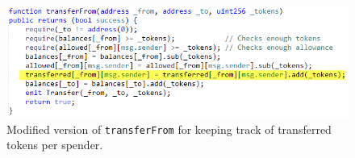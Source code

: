 \begin{figure}[t]
	\centering
	\includegraphics[width=1.0\linewidth]{figures/multiple_withdrawal_14.png}
	\caption{Modified version of \texttt{transferFrom} for keeping track of transferred tokens per spender.\label{fig:transfer1}}
\end{figure}

